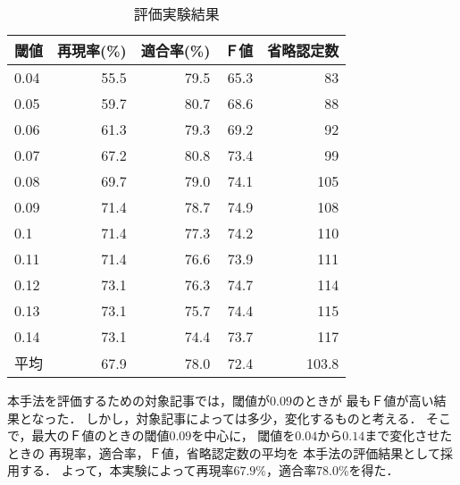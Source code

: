 \begin{table}[bt]
\begin{center}
\caption{評価実験結果} \label{Experiment_Resul}
\begin{tabular}{l|r|r|r|r}
\hline
閾値 & 再現率(\%) & 適合率(\%) & Ｆ値 & 省略認定数\\ \hline \hline
0.04 & 55.5 & 79.5 & 65.3 & 83 \\ 
0.05 & 59.7 & 80.7 & 68.6 & 88 \\ 
0.06 & 61.3 & 79.3 & 69.2 & 92 \\ 
0.07 & 67.2 & 80.8 & 73.4 & 99 \\ 
0.08 & 69.7 & 79.0 & 74.1 & 105 \\ 
0.09 & 71.4 & 78.7 & 74.9 & 108 \\ 
0.1 & 71.4 & 77.3 & 74.2 & 110 \\ 
0.11 & 71.4 & 76.6 & 73.9 & 111 \\ 
0.12 & 73.1 & 76.3 & 74.7 & 114 \\ 
0.13 & 73.1 & 75.7 & 74.4 & 115 \\ 
0.14 & 73.1 & 74.4 & 73.7 & 117 \\ \hline
平均 & 67.9 & 78.0 & 72.4 & 103.8 \\ 
\hline
\end{tabular}
\end{center}
\end{table}
本手法を評価するための対象記事では，閾値が$0.09$のときが
最もＦ値が高い結果となった．
しかし，対象記事によっては多少，変化するものと考える．
そこで，最大のＦ値のときの閾値$0.09$を中心に，
閾値を$0.04$から$0.14$まで変化させたときの
再現率，適合率，Ｆ値，省略認定数の平均を
本手法の評価結果として採用する．
よって，本実験によって再現率$67.9$\%，適合率$78.0$\%を得た．
